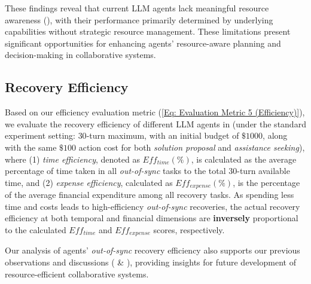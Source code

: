 These findings reveal that current LLM agents lack meaningful resource awareness (), with their performance primarily determined by underlying capabilities without strategic resource management. These limitations present significant opportunities for enhancing agents' resource-aware planning and decision-making in collaborative systems.



\subsection{Recovery Efficiency}
\label{Appendix: Recovery Efficiency}

Based on our efficiency evaluation metric (\eqref{Eq: Evaluation Metric 5 (Efficiency)}), we evaluate the recovery efficiency of different LLM agents in  (under the standard experiment setting: $30$-turn maximum, with an initial budget of $\$1000$, along with the same $\$100$ action cost for both \textcolor{fig2_code}{\textit{solution proposal}} and \textcolor{fig2_ask}{\textit{assistance seeking}}), where (1) \textit{time efficiency}, denoted as $Eff_{time} (\%)$, is calculated as the average percentage of time taken in all \textit{out-of-sync} tasks to the total $30$-turn available time, and (2) \textit{expense efficiency}, calculated as $Eff_{expense} (\%)$, is the percentage of the average financial expenditure among all recovery tasks.
As spending less time and costs leads to high-efficiency \textit{out-of-sync} recoveries, the actual recovery efficiency at both temporal and financial dimensions are \textbf{inversely} proportional to the calculated $Eff_{time}$ and $Eff_{expense}$ scores, respectively.

Our analysis of agents' \textit{out-of-sync} recovery efficiency also supports our previous observations and discussions ( \& ), providing insights for future development of resource-efficient collaborative systems.







